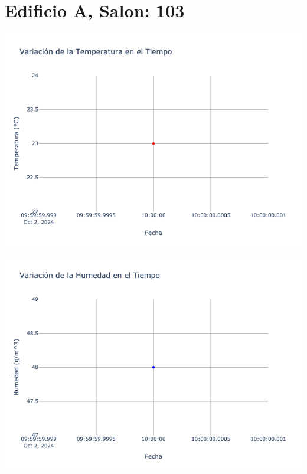 \documentclass{article}
\begin{document}
    \section{Edificio A, Salon: 103}
    \noindent
    \begin{minipage}{0.48\textwidth}
        \centering
        \includegraphics[width=\textwidth]{../img/poli/TS103-90Dias-03-12-2024.png}
    \end{minipage}
    \hfill
    \begin{minipage}{0.48\textwidth}
        \centering
        \includegraphics[width=\textwidth]{../img/poli/HS103-90Dias-03-12-2024.png}
    \end{minipage}
\end{document}
